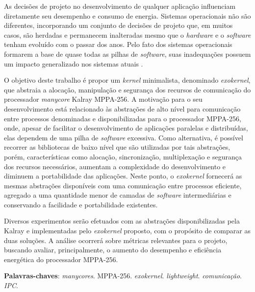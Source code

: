 \documentclass[
	12pt,				%
	openright,			%
	twoside,			%
	a4paper,			%
	english,			%
	brazil,				%
	]{abntex2}
\begin{document}
\begin{resumo}

    As decisões de projeto no desenvolvimento de qualquer aplicação influenciam
    diretamente seu desempenho e consumo de energia.
    Sistemas operacionais não são diferentes, incorporando um conjunto de
    decisões de projeto que, em muitos casos, são herdadas e permanecem
    inalteradas mesmo que o \textit{hardware} e o \textit{software} tenham evoluído com o
    passar dos anos.
    Pelo fato dos sistemas operacionais formarem a base de quase todas as
    pilhas de \textit{software}, suas inadequações possuem um impacto generalizado
    nos sistemas atuais \cite{hunt_singularity:_2007}. 
    
    O objetivo deste trabalho é propor um \textit{kernel} minimalista,
    denominado \textit{exokernel}, que abstraia a alocação, manipulação e
    segurança dos recursos de comunicação do processador \textit{manycore} 
    Kalray MPPA-256.
    A motivação para o seu desenvolvimento está relacionado às abstrações
    de alto nível para comunicação entre processos denominadas \ipc e disponibilizadas
    para o processador MPPA-256, onde, apesar de facilitar o desenvolvimento
    de aplicações paralelas e distribuídas, elas dependem de uma pilha de
    \textit{software} excessiva.
    Como alternativa, é possível recorrer as bibliotecas de baixo nível que
    são utilizadas por tais abstrações, porém, características como alocação,
    sincronização, multiplexação e segurança dos recursos necessários,
    aumentam a complexidade do desenvolvimento e diminuem a portabilidade das
    aplicações.
    Neste ponto, o \textit{exokernel} fornecerá as mesmas abstrações \ipc
    disponíveis com uma comunicação entre processos eficiente, agregado a
    uma quantidade menor de camadas de \textit{software} intermediárias e conservando
    a facilidade e portabilidade existentes.
    
    Diversos experimentos serão efetuados com as abstrações disponibilizadas
    pela Kalray e implementadas pelo \textit{exokernel} proposto, com o propósito
    de comparar as duas soluções.
    A análise ocorrerá sobre métricas relevantes para o projeto, buscando
    avaliar, principalmente, o aumento do desempenho e eficiência energética
    do processador MPPA-256.

 \vspace{\onelineskip}
    
 \noindent
 \textbf{Palavras-chaves}: \textit{manycores}. MPPA-256. \textit{exokernel}. \textit{lightweight}. \textit{comunicação}. \textit{IPC}.
\end{resumo}
\end{document}
